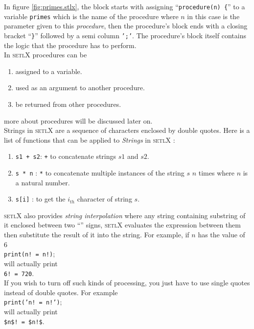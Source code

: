 \documentclass[11pt]{report}
\begin{document}
In figure \ref{fig:primes.stlx}, the block starts with assigning ``\texttt{procedure(n) \{}'' to a variable \texttt{primes} which is the name of the procedure where $n$ in this case is the parameter given to this \textsl{procedure}, then the procedure's block ends with a closing bracket ``\texttt{\}}'' followed by a semi column \texttt{';'}. The procedure's block itself contains the logic that the procedure has to perform.\\
In \textsc{setlX} procedures can be
\begin{enumerate}
\item assigned to a variable.
\item used as an argument to another procedure.
\item be returned from other procedures.
\end{enumerate}
more about procedures will be discussed later on.
\\

Strings in \textsc{setlX} are a sequence of characters enclosed by double quotes. Here is a list of functions that can be applied to \textsl{Strings} in \textsc{setlX} :
\begin{enumerate}
\item \texttt{s1 + s2}: \texttt{+} to concatenate strings $s1$ and $s2$.
\item \texttt{s * n} : \texttt{*} to concatenate multiple instances of the string $s$ $n$ times where $n$ is a natural number.
\item \texttt{s[i]} : to get the $i_{th}$ character of string $s$.
\end{enumerate}
\textsc{setlX} also provides \textsl{string interpolation} where any string containing substring of it enclosed between two ``\texttt{}'' signs, \textsc{setlX} evaluates the expression between them then substitute the result of it into the string. For example, if $n$ has the value of $6$
\\[0.2cm]
\hspace*{1.3cm}
\texttt{print(n! = n!)};
\\[0.2cm]
will actually print
\\[0.2cm]
\hspace*{1.3cm}
\texttt{6! = 720}.
\\[0.2cm]
If you wish to turn off such kinds of processing, you just have to use single quotes instead of double quotes. For example
\\[0.2cm]
\hspace*{1.3cm}
\texttt{print('n! = n!')};
\\[0.2cm]
will actually print
\\[0.2cm]
\hspace*{1.3cm}
\texttt{\$n\$! = \$n!\$}.
\\[0.2cm]
\\
\end{document}
